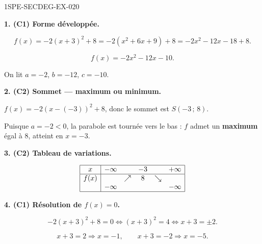 \begin{corrige}{1SPE-SECDEG-EX-020}


\medskip
\textbf{1. (C1) Forme développée.}


\[f(x) = -2(x+3)^2 + 8 = -2(x^2 + 6x + 9) + 8 = -2x^2 - 12x - 18 + 8.\]

\[\boxed{f(x) = -2x^2 - 12x - 10.}\]

On lit $a = -2$, $b = -12$, $c = -10$.

\medskip
\textbf{2. (C2) Sommet — maximum ou minimum.}


$f(x) = -2(x - (-3))^2 + 8$, donc le sommet est $S(-3\,;\,8)$.

Puisque $a = -2 < 0$, la parabole est tournée vers le bas : $f$ admet un \textbf{maximum} égal à $8$, atteint en $x = -3$.

\medskip
\textbf{3. (C2) Tableau de variations.}


\[
\begin{array}{|c|ccccc|}
\hline
x & -\infty & & -3 & & +\infty \\
\hline
f(x) & & \nearrow & 8 & \searrow & \\
 & -\infty & & & & -\infty \\
\hline
\end{array}
\]

\medskip
\textbf{4. (C1) Résolution de $f(x) = 0$.}


\[-2(x+3)^2 + 8 = 0 \iff (x+3)^2 = 4 \iff x + 3 = \pm 2.\]

\[x + 3 = 2 \Rightarrow x = -1, \qquad x + 3 = -2 \Rightarrow x = -5.\]


\end{corrige}
